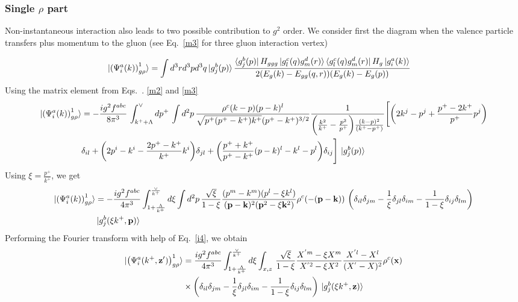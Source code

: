\documentclass[aps,prd,amsmath,amssymb,nofootinbib]{revtex4-2}
\def\v#1{\mathbf{#1}}
\numberwithin{equation}{section}
\begin{document}
\subsubsection{Single $\rho$ part}
Non-instantaneous interaction also leads to two possible contribution to $g^2$ order. We consider first the diagram when the valence particle transfers plus momentum to the gluon 
(see Eq.~\eqref{m3} for three gluon interaction vertex)
\begin{figure}[h]
\end{figure}
\begin{align}\label{onegrho1}
  \ket{ \left(\Psi^{a}_{i}(k) \right)^{1}_{g \rho} }%
   & =
   \int d^3 r d^3p d^3q %
   \ket{g^{b}_{j}(p)}
   \frac{ \bra{g^{b}_{j}(p)}H_{ggg}\ket{g^{c}_{l}(q)g^{d}_{m}(r)}\bra{g^{c}_{l}(q)g^{d}_{m}(r)}H_{g}\ket{g^{a}_{i}(k)}}
   {2(E_{g}(k)-E_{gg}(q,r))(E_{g}(k)-E_{g}(p))}
   \end{align}
   Using the matrix element from Eqs.~. \eqref{m2} and \eqref{m3}
   \begin{align}\label{onegrho12}
\ket{ \left(\Psi^{a}_{i}(k) \right)^{1}_{g \rho} }   & = -\frac{ig^{2}f^{abc}}{8\pi^{3}}\,\int_{k^{+}+\Lambda}^{\vee} dp^{+}\,\int d^{2}p\,\frac{\rho^{c}(k-p)(p-k)^{l}}{\sqrt{p^{+}(p^{+}-k^{+})k^{+}}(p^{+}-k^{+})^{3/2}} \frac{1}{\bigg(\frac{k^{2}}{k^{+}}-\frac{p^{2}}{p^{+}}\bigg)\frac{(k-p)^{2}}{(k^{+}-p^{+})}}\Bigg[\bigg(2k^{j}-p^{j}+\frac{p^{+}-2k^{+}}{p^{+}}p^{j}\bigg)\notag \\ & \delta_{il} +\bigg(2p^{i}-k^{i}-\frac{2p^{+}-k^{+}}{k^{+}}k^{i}\bigg)\delta_{jl}+\bigg(\frac{p^{+}+k^{+}}{p^{+}-k^{+}}(p-k)^{l} - k^{l} - p^{l}\bigg)\delta_{ij}\Bigg]\,\ket{g^{b}_{j}(p)}
\end{align}
Using $\xi = \frac{p^{+}}{k^{+}}$, we get
\begin{align}
 \ket{ \left(\Psi^{a}_{i}(k) \right)^{1}_{g \rho} } &  = - \frac{ig^2 f^{abc}} {4 \pi^3} 
   \int_{1+ \frac{\Lambda}{k^+}   }^{\frac{\vee}{k^+}} %
   d \xi 
   \int d^2p \,
   \frac{\sqrt{\xi}}{1-\xi} \frac{(p^m-k^m) (p^l -\xi k^l)} {(\v{p}-\v{k})^2 (\v{p}^2 - \xi \v{k}^2)}
   \rho^c(-(\v{p}-\v{k}))\,\left( 
  \delta_{il} \delta_{jm}
  - \frac{1}{\xi}\delta_{jl} \delta_{im}
  - \frac{1}{1-\xi}\delta_{ij} \delta_{lm}
   \right)\notag \\ & \ket{g^{b}_{j}(\xi k^+,\v{p})}
\end{align}
Performing the Fourier transform with help of Eq.~\eqref{i4}, we obtain
\begin{align}%
\label{Eq:onegrhoX1}
  \notag
  \ket{ \left(\Psi^{a}_{i} ( k^+, \v{z}') \right)^{1}_{g \rho} }%
   \notag
   &=
   \frac{ig^2 f^{abc}} {4 \pi^3} 
   \int_{1+ \frac{\Lambda}{k^+}   }^{\frac{\vee}{k^+}} %
   d \xi 
   \int_{x,z}\,
   \frac{\sqrt{\xi}}{1-\xi} 
   \frac{X^{'m} - \xi X^m} {X^{'2} - \xi X^2}
   \frac{X^{'l} -  X^l } {(X^{'} -  X)^2}
   \rho^c(\v{x})
  \notag \\ & \times \left( 
  \delta_{il} \delta_{jm}
  - \frac{1}{\xi}\delta_{jl} \delta_{im}
  - \frac{1}{1-\xi}\delta_{ij} \delta_{lm}
   \right)\,\ket{g^{b}_{j}(\xi k^+,\v{z})}
\end{align}
\end{document}
